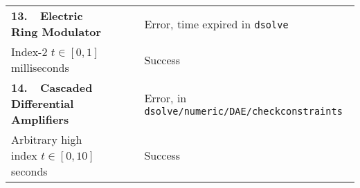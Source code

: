 {\begin{longtable}{lccl}
  \multirow{1}{*}{\textbf{13.~~Electric Ring Modulator~\cite{lioen1998test, mazzia2008test}}}
    & \Maple{}  & \mycrossmark{}\phantom{\mywarnmark{}} & Error, time expired in \texttt{dsolve} \\ \cmidrule{2-4}
    Index-2 \quad $t \in [0, 1]$ milliseconds & \Indigo{} & \mycheckmark{}\phantom{\mywarnmark{}} & Success \\ \midrule
  \multirow{1}{*}{\textbf{14.~~Cascaded Differential Amplifiers~\cite{brenan1995numerical}}}
    & \Maple{}  & \mycrossmark{}\phantom{\mywarnmark{}} & Error, in \texttt{dsolve/numeric/DAE/checkconstraints} \\ \cmidrule{2-4}
    Arbitrary high index \quad $t \in [0, 10]$ seconds & \Indigo{} & \mycheckmark{}\phantom{\mywarnmark{}} & Success \\
  \bottomrule
\end{longtable}}